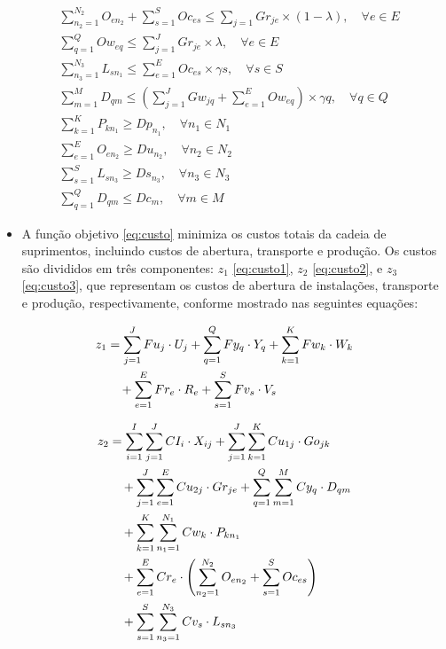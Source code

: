 \documentclass[conference]{IEEEtran}
\begin{document}
\begin{align}
    & \sum\limits_{n_2=1}^{N_2} O_{en_2} + \sum\limits_{s=1}^S Oc_{es} \le \sum\limits_{j=1} Gr_{je}\times(1-\lambda), \quad \forall e\in E \label{eq:restricao13} \\
    & \sum\limits_{q=1}^{Q} Ow_{eq} \le \sum\limits_{j=1}^J Gr_{je} \times \lambda, \quad \forall e \in E \label{eq:restricao14} \\
    & \sum\limits_{n_3=1}^{N_3} L_{sn_1} \le \sum\limits_{e=1}^E Oc_{es} \times \gamma s, \quad \forall s \in S \label{eq:restricao15} \\
    & \sum\limits_{m=1}^M D_{qm} \le \left(\sum\limits_{j=1}^J Gw_{jq} + \sum\limits_{e=1}^E Ow_{eq} \right) \times \gamma q, \quad \forall q \in Q \label{eq:restricao16} \\
    & \sum\limits_{k=1}^K P_{kn_1} \ge Dp_{n_1}, \quad \forall n_1 \in N_1 \label{eq:restricao17}\\
    & \sum\limits_{e=1}^E O_{en_2} \ge Du_{n_2}, \quad \forall n_2 \in N_2 \label{eq:restricao18}\\
    & \sum\limits_{s=1}^S L_{sn_3} \ge Ds_{n_3}, \quad \forall n_3 \in N_3 \label{eq:restricao19}\\
    & \sum\limits_{q=1}^Q D_{qm} \le Dc_{m}, \quad \forall m \in M \label{eq:restricao20}
\end{align}

    
\begin{itemize}
\item A função objetivo \eqref{eq:custo} minimiza os custos totais da cadeia de suprimentos, incluindo custos de abertura, transporte e produção. Os custos são divididos em três componentes: 
$z_1$ \eqref{eq:custo1}, $z_2$ \eqref{eq:custo2}, e $z_3$ \eqref{eq:custo3}, que representam os custos de abertura de instalações, transporte e produção, respectivamente, conforme mostrado nas seguintes equações:
\end{itemize}

\begin{align}
  z_1 &= \sum_{j=1}^J Fu_j \cdot U_j 
      + \sum_{q=1}^Q Fy_q \cdot Y_q 
      + \sum_{k=1}^{K} Fw_k \cdot W_k \notag \\
      &\quad + \sum_{e=1}^{E} Fr_e \cdot R_e
      + \sum_{s=1}^S Fv_s \cdot V_s
      \label{eq:custo1}
\end{align}

\begin{align}
  z_2 &= \sum_{i=1}^I\sum_{j=1}^J CI_i \cdot X_{ij} 
      + \sum_{j=1}^J\sum_{k=1}^K Cu_{1j} \cdot Go_{jk} \notag \\
      &\quad + \sum_{j=1}^J\sum_{e=1}^E Cu_{2j} \cdot Gr_{je} 
      + \sum_{q=1}^Q\sum_{m=1}^M Cy_q \cdot D_{qm} \notag \\
      &\quad + \sum_{k=1}^K\sum_{n_1=1}^{N_1} Cw_k \cdot P_{kn_1} \notag \\
      &\quad + \sum_{e=1}^E Cr_e \cdot \left( \sum_{n_2=1}^{N_2} O_{en_2} 
      + \sum_{s=1}^S Oc_{es} \right) \notag \\
      &\quad + \sum_{s=1}^S\sum_{n_3=1}^{N_3} Cv_s \cdot L_{sn_3}
      \label{eq:custo2}
\end{align}
\end{document}
